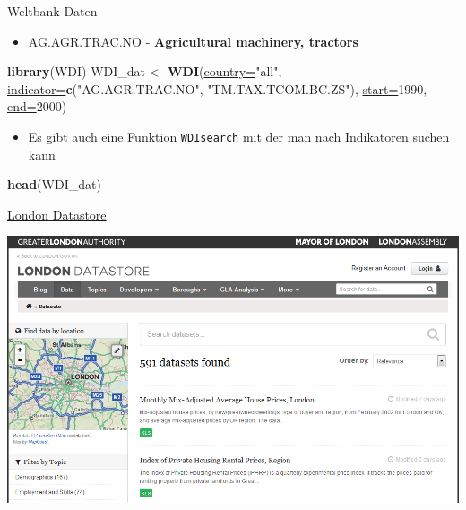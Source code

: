 \documentclass[ignorenonframetext,]{beamer}
\newenvironment{Shaded}{\begin{snugshade}}{\end{snugshade}}
\newcommand{\DataTypeTok}[1]{\textcolor[rgb]{0.74,0.68,0.62}{\underline{#1}}}
\newcommand{\DecValTok}[1]{\textcolor[rgb]{0.27,0.67,0.26}{#1}}
\newcommand{\KeywordTok}[1]{\textcolor[rgb]{0.26,0.66,0.93}{\textbf{#1}}}
\newcommand{\NormalTok}[1]{\textcolor[rgb]{0.74,0.68,0.62}{#1}}
\newcommand{\StringTok}[1]{\textcolor[rgb]{0.02,0.61,0.04}{#1}}
\providecommand{\tightlist}{%
  \setlength{\itemsep}{0pt}\setlength{\parskip}{0pt}}
\begin{document}
\begin{frame}[fragile]{Weltbank Daten}
\protect\hypertarget{weltbank-daten}{}

\begin{itemize}
\tightlist
\item
  AG.AGR.TRAC.NO -
  \href{https://data.worldbank.org/indicator/AG.AGR.TRAC.NO}{\textbf{Agricultural
  machinery, tractors}}
\end{itemize}

\begin{Shaded}
\begin{Highlighting}[]
\KeywordTok{library}\NormalTok{(WDI) }
\NormalTok{WDI_dat <-}\StringTok{ }\KeywordTok{WDI}\NormalTok{(}\DataTypeTok{country=}\StringTok{"all"}\NormalTok{,}
    \DataTypeTok{indicator=}\KeywordTok{c}\NormalTok{(}\StringTok{"AG.AGR.TRAC.NO"}\NormalTok{,}
    \StringTok{"TM.TAX.TCOM.BC.ZS"}\NormalTok{),}
    \DataTypeTok{start=}\DecValTok{1990}\NormalTok{, }\DataTypeTok{end=}\DecValTok{2000}\NormalTok{)}
\end{Highlighting}
\end{Shaded}

\begin{itemize}
\tightlist
\item
  Es gibt auch eine Funktion \texttt{WDIsearch} mit der man nach
  Indikatoren suchen kann
\end{itemize}

\begin{Shaded}
\begin{Highlighting}[]
\KeywordTok{head}\NormalTok{(WDI_dat)}
\end{Highlighting}
\end{Shaded}

\end{frame}

\begin{frame}{\href{http://data.london.gov.uk/dataset}{London
Datastore}}
\protect\hypertarget{london-datastore}{}

\includegraphics{figure/LondonData.PNG}

\end{frame}
\end{document}
